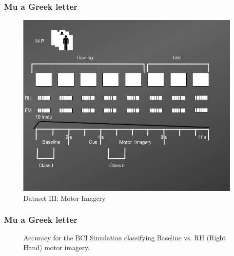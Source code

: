 \documentclass[aspectratio=169]{beamer}
\begin{document}
\begin{frame}
\frametitle{Mu a Greek letter}
\begin{figure}[thpb]
\centering
\setlength\fboxsep{0pt}
\setlength\fboxrule{0.5pt}
\includegraphics[scale=0.38]{images/DatasetIIIDiagram2}    
\caption{\centering Dataset III: Motor Imagery }
\end{figure} 	
\end{frame}	

   \begin{frame}   
   \frametitle{Mu a Greek letter}
   \begin{figure}[thpb]
      \centering
      \setlength\fboxsep{0pt}
	  \setlength\fboxrule{0.5pt}
      \caption{\centering Accuracy for the BCI Simulation classifying Baseline vs. RH (Right Hand) motor imagery.}
      \label{figure3}
   \end{figure} 	
	\end{frame}	  
	
\end{document}
